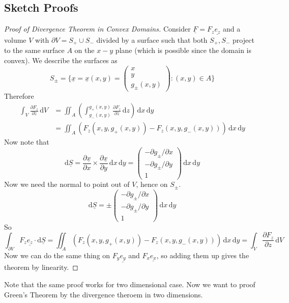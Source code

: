 \subsection{Sketch Proofs}
\begin{proof}[Proof of Divergence Theorem in Convex Domains]
    Consider $\underline{F}=F_z\underline{e_z}$ and a volume $V$ with $\partial V=S_+\cup S_-$ divided by a surface such that both $S_+,S_-$ project to the same surface $A$ on the $x-y$ plane (which is possible since the domain is convex).
    We describe the surfaces as
    $$S_{\pm}=\{\underline{x}=\underline{x}(x,y)=\begin{pmatrix}
        x\\
        y\\
        g_{\pm}(x,y)
    \end{pmatrix}:(x,y)\in A\}$$
    Therefore
    \begin{align*}
        \int_V\frac{\partial F_z}{\partial z}\,\mathrm dV&=\iint_A\left( \int_{g_-(x,y)}^{g_+(x,y)} \frac{\partial F_z}{\partial z}\,\mathrm dz\right)\,\mathrm dx\,\mathrm dy\\
        &=\iint_A(F_z(x,y,g_+(x,y))-F_z(x,y,g_-(x,y)))\,\mathrm dx\,\mathrm dy
    \end{align*}
    Now note that
    $$\mathrm d\underline{S}=\frac{\partial\underline{x}}{\partial x}\times\frac{\partial\underline{x}}{\partial y}\,\mathrm dx\,\mathrm dy=\begin{pmatrix}
        -\partial g_\pm/\partial x\\
        -\partial g_\pm/\partial y\\
        1
    \end{pmatrix}\,\mathrm dx\,\mathrm dy$$
    Now we need the normal to point out of $V$, hence on $S_\pm$.
    $$\mathrm d\underline{S}=\pm\begin{pmatrix}
        -\partial g_\pm/\partial x\\
        -\partial g_\pm/\partial y\\
        1
    \end{pmatrix}\,\mathrm dx\,\mathrm dy$$
    So
    $$\int_{\partial V}F_z\underline{e_z}\cdot\mathrm d\underline{S}=\iint_A(F_z(x,y,g_+(x,y))-F_z(x,y,g_-(x,y)))\,\mathrm dx\,\mathrm dy=\int_V\frac{\partial F_z}{\partial z}\,\mathrm dV$$
    Now we can do the same thing on $F_y\underline{e_y}$ and $F_x\underline{e_x}$, so adding them up gives the theorem by linearity.
\end{proof}
Note that the same proof works for two dimensional case.
Now we want to proof Green's Theorem by the divergence theroem in two dimensions.
